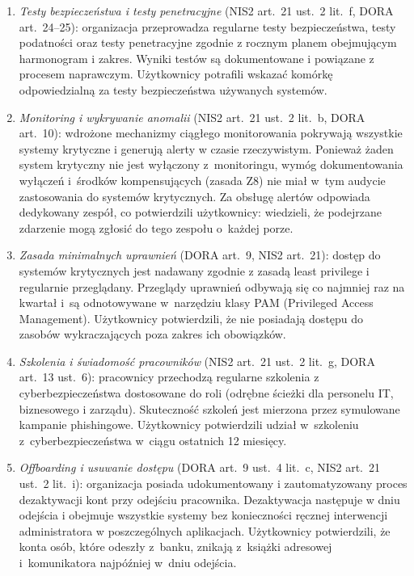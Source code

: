 \begin{enumerate}[label=(\roman*)]
  \item \textit{Testy bezpieczeństwa i testy penetracyjne} (NIS2 art.~21 ust.~2 lit.~f, DORA art.~24--25): organizacja przeprowadza regularne testy bezpieczeństwa, testy podatności oraz testy penetracyjne zgodnie z rocznym planem obejmującym harmonogram i zakres. Wyniki testów są dokumentowane i powiązane z procesem naprawczym. Użytkownicy potrafili wskazać komórkę odpowiedzialną za testy bezpieczeństwa używanych systemów.

  \item \textit{Monitoring i wykrywanie anomalii} (NIS2 art.~21 ust.~2 lit.~b, DORA art.~10): wdrożone mechanizmy ciągłego monitorowania pokrywają wszystkie systemy krytyczne i generują alerty w czasie rzeczywistym. Ponieważ żaden system krytyczny nie jest wyłączony z~monitoringu, wymóg dokumentowania wyłączeń i~środków kompensujących (zasada Z8) nie miał w~tym audycie zastosowania do systemów krytycznych. Za obsługę alertów odpowiada dedykowany zespół, co potwierdzili użytkownicy: wiedzieli, że podejrzane zdarzenie mogą zgłosić do tego zespołu o~każdej porze.

  \item \textit{Zasada minimalnych uprawnień} (DORA art.~9, NIS2 art.~21): dostęp do systemów krytycznych jest nadawany zgodnie z zasadą least privilege i regularnie przeglądany. Przeglądy uprawnień odbywają się co najmniej raz na kwartał i~są odnotowywane w~narzędziu klasy PAM (Privileged Access Management). Użytkownicy potwierdzili, że nie posiadają dostępu do zasobów wykraczających poza zakres ich obowiązków.

  \item \textit{Szkolenia i świadomość pracowników} (NIS2 art.~21 ust.~2 lit.~g, DORA art.~13 ust.~6): pracownicy przechodzą regularne szkolenia z cyberbezpieczeństwa dostosowane do roli (odrębne ścieżki dla personelu IT, biznesowego i zarządu). Skuteczność szkoleń jest mierzona przez symulowane kampanie phishingowe. Użytkownicy potwierdzili udział w~szkoleniu z~cyberbezpieczeństwa w~ciągu ostatnich 12 miesięcy.

  \item \textit{Offboarding i usuwanie dostępu} (DORA art.~9 ust.~4 lit.~c, NIS2 art.~21 ust.~2 lit.~i): organizacja posiada udokumentowany i zautomatyzowany proces dezaktywacji kont przy odejściu pracownika. Dezaktywacja następuje w dniu odejścia i obejmuje wszystkie systemy bez konieczności ręcznej interwencji administratora w poszczególnych aplikacjach. Użytkownicy potwierdzili, że konta osób, które odeszły z~banku, znikają z~książki adresowej i~komunikatora najpóźniej w~dniu odejścia.


\end{enumerate}
